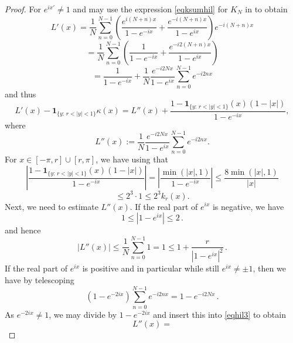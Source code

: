 \begin{proof}
For $e^{ix'}\neq 1$
and may use the expression
\eqref{eqksumhil} for $K_N$
in  to obtain
\begin{equation*}
    {L'}(x)= \frac 1N\sum_{n=0}^{N-1}
     \left(\frac{e^{i(N+n)x}}{1-e^{-ix}}
      +\frac {e^{-i(N+n)x}}{1-e^{ix}}\right) e^{-i(N+n)x}
\end{equation*}
\begin{equation*}
    = \frac 1N\sum_{n=0}^{N-1}
    \left(\frac{1}{1-e^{-ix}}
      +\frac {e^{-i2(N+n)x}}{1-e^{ix}}\right)
\end{equation*}
\begin{equation}\label{eqhil3}
    = \frac{1}{1-e^{-ix}} +
     \frac 1N \frac {e^{-i2Nx}}{1-e^{ix}}
     \sum_{n=0}^{N-1}
    {e^{-i2nx}}
\end{equation}
and thus
\begin{equation}
\label{eq-L'L''}
  {L'}(x) -\mathbf{1}_{\{y:\, r<|y|<1\}}\kappa(x)=L''(x)+ \frac{1-\mathbf{1}_{{\{y:\, r<|y|<1\}}}(x)(1-|x|)}{1-e^{-ix}},
\end{equation}
where
$$L''(x):=\frac 1N \frac {e^{-i2Nx}}{1-e^{ix}}
     \sum_{n=0}^{N-1}
    {e^{-i2nx}}.$$
For $x\in [-\pi, r]\cup [r, \pi]$, we have using  that
\begin{equation*}
   \left|\frac{1-\mathbf{1}_{{\{y:\, r<|y|<1\}}}(x)(1-|x|)}{1-e^{-ix}} \right|=\left|\frac{\min(|x|, 1)}{1-e^{-ix}} \right|\leq \frac{8\min(|x|, 1)}{|x|}
\end{equation*}
\begin{equation}
 \label{eq-diffzero2}
    \leq 2^3\cdot 1\leq 2^{3} k_r(x).
\end{equation}
Next, we need to estimate $L''(x)$. If the real part of
$e^{ix}$ is negative, we have
\begin{equation}
  1\le |1-e^{ix}|\le 2\, .
\end{equation}
and hence
\begin{equation}\label{eqhil12}
    |L''(x)|\le
     \frac 1N
     \sum_{n=0}^{N-1}
    1=1\le 1+\frac r{|1-e^{ix}|^2}\, .
\end{equation}
If the real part of $e^{ix}$ is positive and in particular while still $e^{ix}\neq \pm 1$, then we have by telescoping
\begin{equation}
 (1-e^{-2ix})
     \sum_{n=0}^{N-1}
    {e^{-i2nx}}=1-e^{-i2Nx}\, .
\end{equation}
As $e^{-2ix}\neq 1$, we may divide by $1-e^{-2ix}$ and insert this into
\eqref{eqhil3} to obtain
\begin{equation}
 L''(x)=

\end{equation}
\end{proof}
